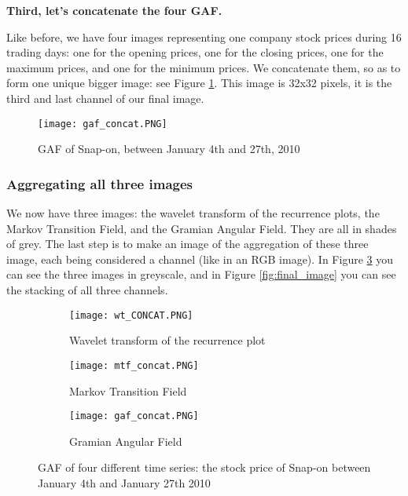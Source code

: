 \documentclass[11pt]{article}
\begin{document}
\begin{onehalfspace}
\noindent \textbf{Third, let's concatenate the four GAF.}

Like before, we have four images representing one company stock prices during 16 trading days: one for the opening prices, one for the closing prices, one for the maximum prices, and one for the minimum prices. We concatenate them, so as to form one unique bigger image: see Figure \ref{fig:gaf_concat}. This image is 32x32 pixels, it is the third and last channel of our final image. 

\begin{figure}[h!]
    \centering
    \captionsetup{justification=centering}
    \texttt{[image: gaf\_concat.PNG]}
    \caption{GAF of Snap-on, between January 4th and 27th, 2010}
\label{fig:gaf_concat}
\end{figure}

\subsubsection{Aggregating all three images}

We now have three images: the wavelet transform of the recurrence plots, the Markov Transition Field, and the Gramian Angular Field. They are all in shades of grey. The last step is to make an image of the aggregation of these three image, each being considered a channel (like in an RGB image). In Figure \ref{fig:3channels} you can see the three images in greyscale, and in Figure \ref{fig:final_image} you can see the stacking of all three channels. 

\begin{figure}[h!]
    \centering
    \captionsetup{justification=centering}
    \begin{subfigure}{0.32\textwidth}
        \texttt{[image: wt\_CONCAT.PNG]}
        \caption{Wavelet transform of the recurrence plot}
        \label{fig:open_concat}
    \end{subfigure}
    \begin{subfigure}{0.32\textwidth}
        \texttt{[image: mtf\_concat.PNG]}
        \caption{Markov Transition Field}
    \end{subfigure}
    \begin{subfigure}{0.32\textwidth}
        \texttt{[image: gaf\_concat.PNG]}
        \caption{Gramian Angular Field}
    \end{subfigure}    
    \caption{GAF of four different time series: the stock price of Snap-on between January 4th and January 27th 2010}
    \label{fig:3channels}
\end{figure}


\end{onehalfspace}
\end{document}
